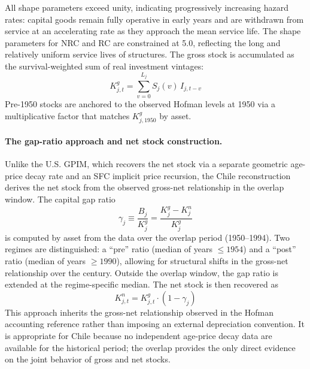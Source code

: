 All shape parameters exceed unity, indicating progressively
increasing hazard rates: capital goods remain fully operative in
early years and are withdrawn from service at an accelerating rate
as they approach the mean service life. The shape parameters for
NRC and RC are constrained at 5.0, reflecting the long and
relatively uniform service lives of structures. The gross stock is
accumulated as the survival-weighted sum of real investment
vintages:
\begin{equation}
	K^{g}_{j,t} = \sum_{v=0}^{L_j} S_j(v)\, I_{j,t-v}
	\label{eq:42:gross_stock_chile}
\end{equation}
Pre-1950 stocks are anchored to the observed Hofman levels at 1950
via a multiplicative factor that matches $K^{g}_{j,1950}$ by asset.

\paragraph{The gap-ratio approach and net stock construction.}
Unlike the U.S. GPIM, which recovers the net stock via a separate
geometric age-price decay rate and an SFC implicit price recursion,
the Chile reconstruction derives the net stock from the observed
gross-net relationship in the \citet{Hofman2000b} overlap window.
The capital gap ratio
\begin{equation}
	\gamma_j \equiv \frac{B_j}{K^{g}_j}
	= \frac{K^{g}_j - K^{n}_j}{K^{g}_j}
	\label{eq:42:gap_ratio}
\end{equation}
is computed by asset from the \citet{Hofman2000b} data over the
overlap period (1950--1994). Two regimes are distinguished: a
``pre'' ratio (median of years $\leq 1954$) and a ``post'' ratio
(median of years $\geq 1990$), allowing for structural shifts in
the gross-net relationship over the century. Outside the overlap
window, the gap ratio is extended at the regime-specific median.
The net stock is then recovered as
\begin{equation}
	K^{n}_{j,t} = K^{g}_{j,t} \cdot (1 - \gamma_j)
	\label{eq:42:net_stock_chile}
\end{equation}
This approach inherits the gross-net relationship observed in the
Hofman accounting reference rather than imposing an external
depreciation convention. It is appropriate for Chile because no
independent age-price decay data are available for the historical
period; the \citet{Hofman2000b} overlap provides the only direct
evidence on the joint behavior of gross and net stocks.

